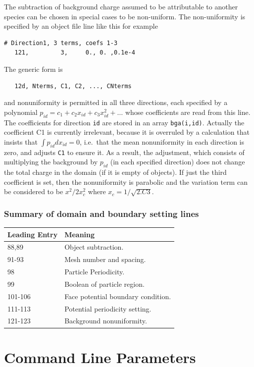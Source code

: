 \documentclass[12pt]{article}
\begin{document}
The subtraction of background charge assumed to be attributable to
another species can be chosen in special cases to be non-uniform. 
The non-uniformity is specified by an object file line like this
for example
\begin{verbatim}
# Direction1, 3 terms, coefs 1-3 
   121,         3,     0., 0. ,0.1e-4
\end{verbatim}
The generic form is 
\begin{verbatim}
   12d, Nterms, C1, C2, ..., CNterms
\end{verbatim}
and nonuniformity is permitted in all three directions, each specified
by a polynomial $p_{id}=c_1+c_2x_{id}+c_3x_{id}^2+\dots$ whose
coefficients are read from this line. The coefficients for direction
\verb!id! are stored in an array \verb!bga(i,id)!. Actually the
coefficient C1 is currently irrelevant, because it is overruled by a
calculation that insists that $\int p_{id} dx_{id}=0$, i.e.\ that the
mean nonuniformity in each direction is zero, and adjusts \verb!C1! to
ensure it. As a result, the adjustment, which consists of multiplying
the background by $p_{id}$ (in each specified direction) does not
change the total charge in the domain (if it is empty of objects). If
just the third coefficient is set, then the nonuniformity is
parabolic and the variation term can be considered to be $x^2/2x_c^2$
where $x_c=1/\sqrt{2.C3}$.

\subsubsection*{Summary of domain and boundary setting lines}

\par
\begin{tabular}{|l|l|}
\hline
Leading Entry & Meaning\\
\hline
88,89    & Object subtraction.\\
91-93    & Mesh number and spacing.\\
98       & Particle Periodicity.\\
99       & Boolean of particle region.\\
101-106  & Face potential boundary condition.\\
111-113  & Potential periodicity setting.\\
121-123  & Background nonuniformity.\\
\hline
\end{tabular}

\section{Command Line Parameters}\label{cmdline}
\end{document}
